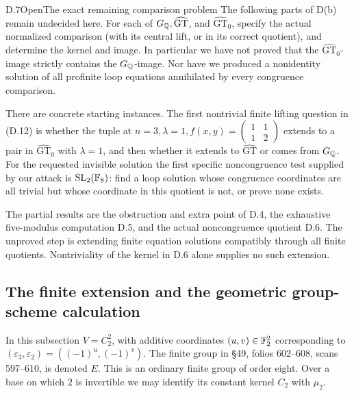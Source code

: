 \begin{statement}{D.7}{Open}{The exact remaining comparison problem}
The following parts of D(b) remain undecided here.
For each of \(G_\mathbb Q,\widehat{\mathrm{GT}}\), and
\(\widehat{\mathrm{GT}}_0\), specify the actual normalized
comparison (with its central lift, or in its correct quotient),
and determine the kernel and image.
In particular we have not proved that the
\(\widehat{\mathrm{GT}}_0\)-image strictly contains the
\(G_\mathbb Q\)-image.  Nor have we produced a nonidentity solution of
all profinite loop equations annihilated by every congruence
comparison.

There are concrete starting instances.  The first nontrivial
finite lifting question in (D.12) is whether the tuple at
\(n=3,\lambda=1,f(x,y)=
\left(\begin{smallmatrix}1&1\\1&2\end{smallmatrix}\right)\)
extends to a pair in \(\widehat{\mathrm{GT}}_0\) with
\(\lambda=1\), and then whether it extends to
\(\widehat{\mathrm{GT}}\) or comes from \(G_\mathbb Q\).
For the requested invisible solution the first specific
noncongruence test supplied by our attack is
\(\operatorname{SL}_2(\mathbb F_8)\): find a loop solution whose congruence
coordinates are all trivial but whose coordinate in this
quotient is not, or prove none exists.

The partial results are the obstruction and extra point of D.4,
the exhaustive five-modulus computation D.5, and the actual
noncongruence quotient D.6.  The unproved step is extending
finite equation solutions compatibly through all finite
quotients.  Nontriviality of the kernel in D.6 alone supplies
no such extension.
\end{statement}

\subsection{The finite extension and the geometric group-scheme calculation}

In this subsection \(V=C_2^2\), with additive coordinates
\((u,v)\in\mathbb F_2^2\) corresponding to
\((\varepsilon _3,\varepsilon _2)=((-1)^u,(-1)^v)\).
The finite group in \S49, folios 602--608, scans 597--610,
is denoted \(E\).  This is an ordinary finite group of order eight.
Over a base on which \(2\) is invertible we may identify its
constant kernel \(C_2\) with \(\mu _2\).

